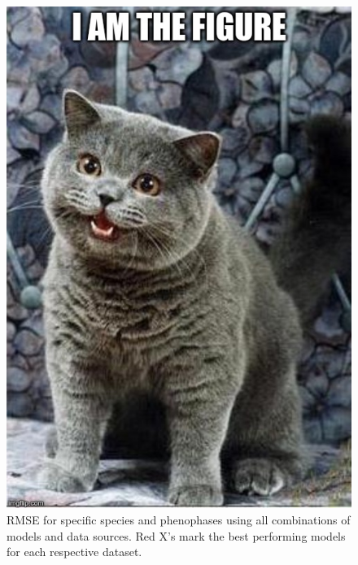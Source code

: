 \begin{figure}
	\centering
	\includegraphics[scale=0.5]{images/figure_filler.jpg}
	\caption[RMSE for specific species and phenophases using all combinations of models and data sources]{RMSE for specific species and phenophases using all combinations of models and data sources. Red X's mark the best performing models for each respective dataset.} \label{fig-a-5}
\end{figure}

\newpage


